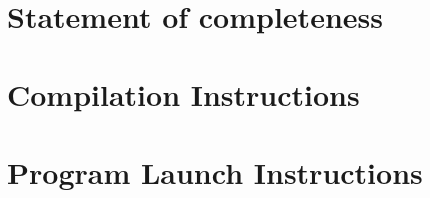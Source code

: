 \documentclass{article}
\title{
\vspace{2in}
\textmd{\huge\textbf{\Class}}\\
\textmd{{\Title}}\\
\vspace{3in}
\textmd{{\AuthorName}}
}
\author{}
\begin{document}
\maketitle
\clearpage

\section{Statement of completeness}



\section{Compilation Instructions}



\section{Program Launch Instructions}



\clearpage
\end{document}

